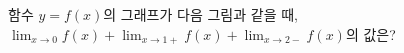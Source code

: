 함수 $y=f(x)$의 그래프가 다음 그림과 같을 때, $\displaystyle\lim_{x\to 0} f(x)+\lim_{x\to 1+} f(x)+\lim_{x\to 2-} f(x)$의 값은?
\par\smallskip\begin{center}\resizebox{\ifdim\width>\linewidth\linewidth\else\width\fi}{!}{}\end{center}

